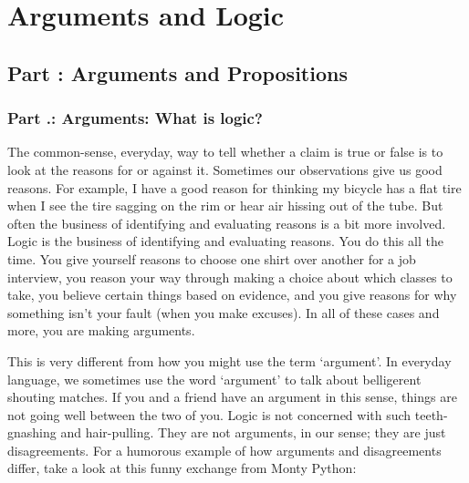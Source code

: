 \part{Arguments and Logic}
\label{ch.intro}


\chapter{Part \thechapcount: Arguments and Propositions}
\section{Part \thechapcount.\theseccount: Arguments: What is logic?}
\label{s.arguments}

The common-sense, everyday, way to tell whether a claim is true or false is to look at the reasons for or against it. Sometimes our observations give us good reasons. For example, I have a good reason for thinking my bicycle has a flat tire when I see the tire sagging on the rim or hear air hissing out of the tube. But often the business of identifying and evaluating reasons is a bit more involved. Logic is the business of identifying and evaluating reasons. You do this all the time. You give yourself reasons to choose one shirt over another for a job interview, you reason your way through making a choice about which classes to take, you believe certain things based on evidence, and you give reasons for why something isn't your fault (when you make excuses). In all of these cases and more, you are making \glspl{argument}.

This is very different from how you might use the term ‘argument'. In everyday language, we sometimes use the word ‘argument’ to talk about belligerent shouting matches. If you and a friend have an argument in this sense, things are not going well between the two of you. Logic is not concerned with such teeth-gnashing and hair-pulling. They are not arguments, in our sense; they are just disagreements. For a humorous example of how arguments and disagreements differ, take a look at this funny exchange from Monty Python:\autocite{ArgumentClinic}

